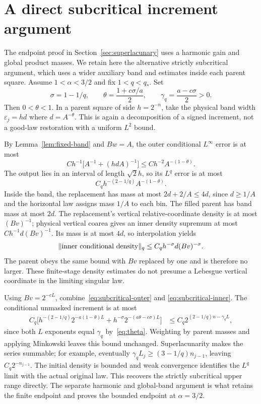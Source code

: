 \section{A direct subcritical increment argument}\label{app:subcritical}
The endpoint proof in Section~\ref{sec:superlacunary} uses a harmonic gain
and global product masses. We retain here the alternative strictly
subcritical argument, which uses a wider auxiliary band and estimates
inside each parent square. Assume $1<\alpha<3/2$ and fix $1<q<q_*$.
Set
\begin{equation}\label{eq:theta}
 \sigma=1-1/q,\qquad
 \theta=\frac{1+c\sigma/a}{2},\qquad
 \gamma_q=\frac{a-c\sigma}{2}>0.
\end{equation}
Then $0<\theta<1$. In a parent square of side $h=2^{-n}$, take the
physical band width $\varepsilon_j=hd$ where $d=A^{-\theta}$.
This is again a decomposition of a signed increment, not a good-law
restoration with a uniform $L^2$ bound.

By Lemma~\ref{lem:fixed-band} and $Bw=A$, the outer conditional
$L^\infty$ error is at most
\[
 Ch^{-1}\bigl[A^{-1}+(hdA)^{-1}\bigr]
 \leq Ch^{-2}A^{-(1-\theta)}.
\]
The output lies in an interval of length $\sqrt2h$, so its $L^q$ error
is at most
\begin{equation}\label{eq:subcritical-outer}
 C_qh^{-(2-1/q)}A^{-(1-\theta)}.
\end{equation}
Inside the band, the replacement has mass at most $2d+2/A\leq4d$,
since $d\geq1/A$ and the horizontal law assigns mass $1/A$ to each
bin. The filled parent has band mass at most $2d$. The replacement's
vertical relative-coordinate density is at most $(Bv)^{-1}$; physical
vertical coarea gives an inner density supremum at most
$Ch^{-1}d(Bv)^{-1}$. Its mass is at most $4d$, so interpolation yields
\begin{equation}\label{eq:subcritical-inner}
 \lVert \text{inner conditional density}\rVert_q
 \leq C_q h^{-\sigma}d(Bv)^{-\sigma}.
\end{equation}
The parent obeys the same bound with $Bv$ replaced by one and is therefore
no larger. These finite-stage density estimates do not presume a
Lebesgue vertical coordinate in the limiting singular law.

Using $Bv=2^{-cL}$, combine~\eqref{eq:subcritical-outer} and
\eqref{eq:subcritical-inner}. The conditional unmasked increment is at most
\begin{align}
 C_q\bigl[h^{-(2-1/q)}2^{-a(1-\theta)L}
       +h^{-\sigma}2^{-(a\theta-c\sigma)L}\bigr]
 &\leq C_q2^{(2-1/q)n-\gamma_qL},\label{eq:subcritical-increment}
\end{align}
since both $L$ exponents equal $\gamma_q$ by~\eqref{eq:theta}.
Weighting by parent masses and applying Minkowski leaves this bound
unchanged. Superlacunarity makes the series summable; for example,
eventually $\gamma_qL_j\geq(3-1/q)n_{j-1}$, leaving $C_q2^{-n_{j-1}}$.
The initial density is bounded and weak convergence identifies the $L^q$
limit with the actual original law. This recovers the strictly subcritical
upper range directly. The separate harmonic and global-band argument is
what retains the finite endpoint and proves the bounded endpoint at
$\alpha=3/2$.
